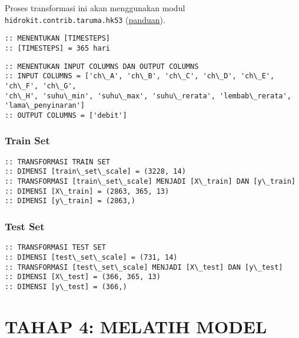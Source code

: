 \documentclass[11pt]{article}
\begin{document}
Proses transformasi ini akan menggunakan modul
\texttt{hidrokit.contrib.taruma.hk53}
(\href{https://nbviewer.jupyter.org/gist/taruma/50460ebfaab5a30c41e7f1a1ac0853e2}{panduan}).

    \begin{Verbatim}[commandchars=\\\{\}]
:: MENENTUKAN [TIMESTEPS]
:: [TIMESTEPS] = 365 hari
    \end{Verbatim}

    \begin{Verbatim}[commandchars=\\\{\}]
:: MENENTUKAN INPUT COLUMNS DAN OUTPUT COLUMNS
:: INPUT COLUMNS = ['ch\_A', 'ch\_B', 'ch\_C', 'ch\_D', 'ch\_E', 'ch\_F', 'ch\_G',
'ch\_H', 'suhu\_min', 'suhu\_max', 'suhu\_rerata', 'lembab\_rerata',
'lama\_penyinaran']
:: OUTPUT COLUMNS = ['debit']
    \end{Verbatim}

    \hypertarget{train-set}{%
\subsubsection{Train Set}\label{train-set}}

    \begin{Verbatim}[commandchars=\\\{\}]
:: TRANSFORMASI TRAIN SET
:: DIMENSI [train\_set\_scale] = (3228, 14)
:: TRANSFORMASI [train\_set\_scale] MENJADI [X\_train] DAN [y\_train]
:: DIMENSI [X\_train] = (2863, 365, 13)
:: DIMENSI [y\_train] = (2863,)
    \end{Verbatim}

    \hypertarget{test-set}{%
\subsubsection{Test Set}\label{test-set}}

    \begin{Verbatim}[commandchars=\\\{\}]
:: TRANSFORMASI TEST SET
:: DIMENSI [test\_set\_scale] = (731, 14)
:: TRANSFORMASI [test\_set\_scale] MENJADI [X\_test] DAN [y\_test]
:: DIMENSI [X\_test] = (366, 365, 13)
:: DIMENSI [y\_test] = (366,)
    \end{Verbatim}

    \hypertarget{tahap-4-melatih-model}{%
\section{TAHAP 4: MELATIH MODEL}\label{tahap-4-melatih-model}}
\end{document}
